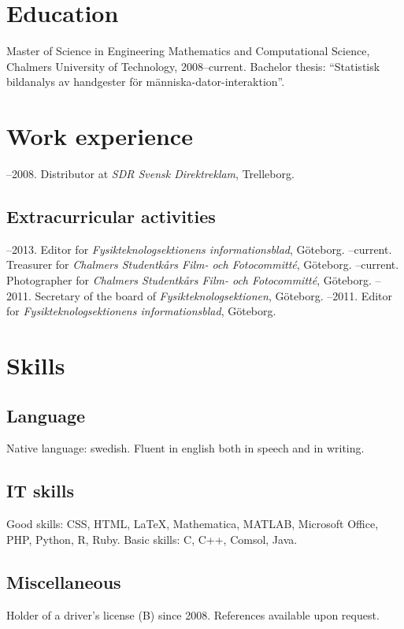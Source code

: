 \documentclass{skvitae}
\author{Simon Sigurdhsson}
\affiliation{}
\begin{document}
	\maketitle

	\section{Education}
	\ind Master of Science in Engineering Mathematics and Computational Science, Chalmers University of Technology, 2008--current. Bachelor thesis: \foreignquote{swedish}{Statistisk bildanalys av handgester för människa-dator-interaktion}.

	\section{Work experience}
	--2008. Distributor at \emph{SDR Svensk Direktreklam}, Trelleborg.

	\medskip
	\subsection{Extracurricular activities}
	--2013. Editor for \emph{Fysikteknologsektionens informationsblad}, Göteborg.
	--current. Treasurer for \emph{Chalmers Studentkårs Film- och Fotocommitté}, Göteborg.
	--current. Photographer for \emph{Chalmers Studentkårs Film- och Fotocommitté}, Göteborg.
	--2011. Secretary of the board of \emph{Fysikteknologsektionen}, Göteborg.
	--2011. Editor for \emph{Fysikteknologsektionens informationsblad}, Göteborg.

	\section{Skills}
	\subsection{Language}
	\ind Native language: swedish. Fluent in english both in speech and in writing.

	\medskip
	\subsection{IT skills}
	\ind Good skills: CSS, HTML, \LaTeX, Mathematica, MATLAB, Microsoft Office, PHP, Python, R, Ruby.
	\ind Basic skills: C, C++, Comsol, Java.

	\medskip
	\subsection{Miscellaneous}
	\ind Holder of a driver's license (B) since 2008.
	\ind References available upon request.
\end{document}
